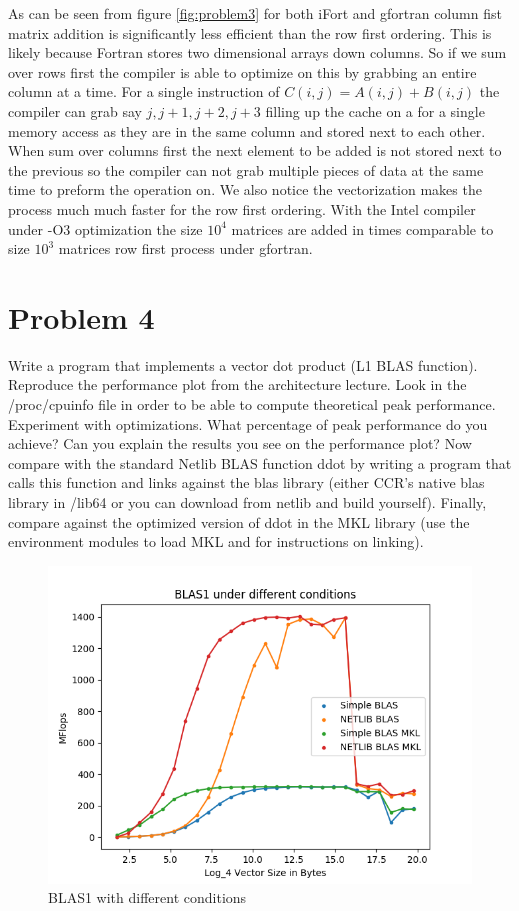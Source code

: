 \documentclass[12pt]{article}
\theoremstyle{plain}
\theoremstyle{definition}
\begin{document}
As can be seen from figure \ref{fig:problem3} for both iFort and gfortran  column fist matrix addition is significantly less efficient than the row first ordering. This is likely because Fortran stores two dimensional arrays down columns. So if we sum over rows first the compiler is able to optimize on this by grabbing an entire column at a time. For a single instruction of $C(i,j) = A(i,j) + B(i,j)$ the compiler can grab say $j,j+1,j+2,j+3$ filling up the cache on a for a single memory access as they are in the same column and stored next to each other. When sum over columns first the next element to be added is not stored next to the previous so the compiler can not grab multiple pieces of data at the same time to preform the operation on. We also notice the vectorization makes the process much much faster for the row first ordering. With the Intel compiler under -O3 optimization the size $10^4$ matrices are added in times comparable to  size $10^3$ matrices row first process under gfortran.

 
\section*{Problem 4}
Write a program that implements a vector dot product (L1 BLAS function). Reproduce
the performance plot from the architecture lecture. Look in the /proc/cpuinfo file in
order to be able to compute theoretical peak performance. Experiment with optimizations.
What percentage of peak performance do you achieve? Can you explain the results
you see on the performance plot?
Now compare with the standard Netlib BLAS function ddot by writing a program that
calls this function and links against the blas library (either CCR’s native blas library in
/lib64 or you can download from netlib and build yourself).
Finally, compare against the optimized version of ddot in the MKL library (use the
environment modules to load MKL and for instructions on linking).

\begin{figure}  
\label{fig:problem4}
\includegraphics[scale=0.7]{problem4.png}
\caption{BLAS1 with different conditions}
\end{figure}
\end{document}
